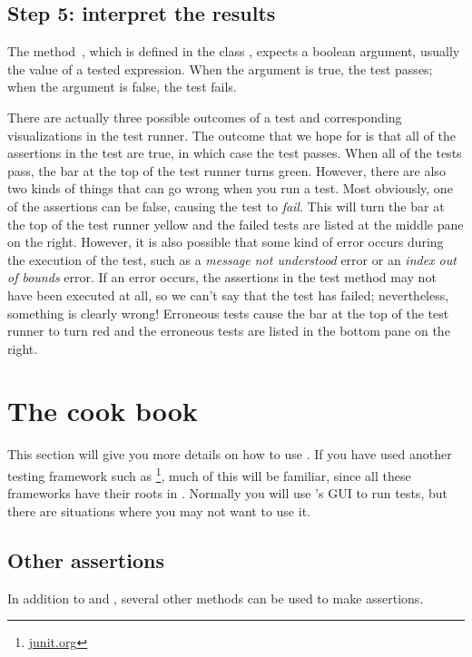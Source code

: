 \documentclass[a4paper,10pt,twoside]{book}
\begin{document}
\subsection{Step 5: interpret the results}

The method \,, which is defined in the class , expects a boolean argument, usually the value of a tested expression.
When the argument is true, the test passes; when the argument is false, the test fails.

There are actually three possible outcomes of a test and corresponding visualizations in the test runner.
The outcome that we hope for is that all of the assertions in the test are true, in which case the test passes.
When all of the tests pass, the bar at the top of the test runner turns green.
However, there are also two kinds of things that can go wrong when you run a test.
Most obviously, one of the assertions can be false, causing the test to \emph{fail}.
This will turn the bar at the top of the test runner yellow and the failed tests are listed at the middle pane on the right.
However, it is also possible that some kind of error occurs during the execution of the test, such as a \emph{message not understood} error or an \emph{index out of bounds} error.
If an error occurs, the assertions in the test method may not have been executed at all, so we can't say that the test has failed; nevertheless, something is clearly wrong!
Erroneous tests cause the bar at the top of the test runner to turn red and the erroneous tests are listed in the bottom pane on the right.


\section{The \SUnit cook book}
This section will give you more details on how to use \SUnit.
If you have used another testing framework such as \JUnit\footnote{\url{junit.org}}, much of this will be familiar, since all these frameworks have their roots in \SUnit.
Normally you will use \SUnit's GUI to run tests, but there are situations where you may not want to use it.
\subsection{Other assertions}
In addition to  and , several other methods can be used to make assertions.
\end{document}
